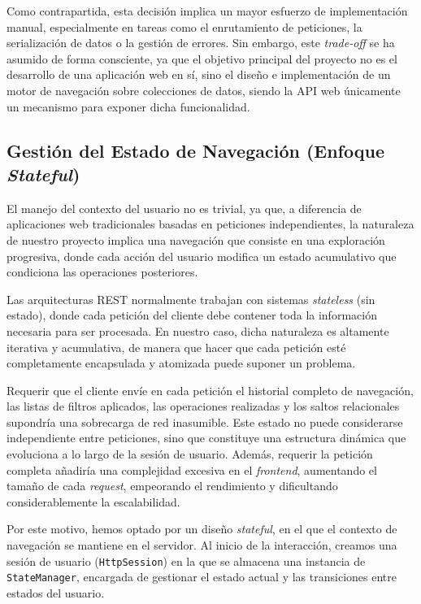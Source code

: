 Como contrapartida, esta decisión implica un mayor esfuerzo de implementación manual, especialmente en tareas
como el enrutamiento de peticiones, la serialización de datos o la gestión de errores. Sin embargo, este
\textit{trade-off} se ha asumido de forma consciente, ya que el objetivo principal del proyecto no es el
desarrollo de una aplicación web en sí, sino el diseño e implementación de un motor de navegación sobre
colecciones de datos, siendo la API web únicamente un mecanismo para exponer dicha funcionalidad.

    \subsection*{Gestión del Estado de Navegación (Enfoque \textit{Stateful})}

El manejo del contexto del usuario no es trivial, ya que, a diferencia de aplicaciones web tradicionales basadas 
en peticiones independientes, la naturaleza de nuestro proyecto implica una navegación que consiste en una exploración 
progresiva, donde cada acción del usuario modifica un estado acumulativo que condiciona las operaciones posteriores.

Las arquitecturas REST normalmente trabajan con sistemas \textit{stateless} (sin estado), donde cada petición del
cliente debe contener toda la información necesaria para ser procesada. En nuestro caso, dicha naturaleza es altamente
iterativa y acumulativa, de manera que hacer que cada petición esté completamente encapsulada y atomizada puede suponer
un problema.

Requerir que el cliente envíe en cada petición el historial completo de navegación, las listas de filtros aplicados,
las operaciones realizadas y los saltos relacionales supondría una sobrecarga de red inasumible. Este estado no puede
considerarse independiente entre peticiones, sino que constituye una estructura dinámica que evoluciona a lo largo de
la sesión de usuario. Además, requerir la petición completa añadiría una complejidad excesiva en el \textit{frontend},
aumentando el tamaño de cada \textit{request}, empeorando el rendimiento y dificultando considerablemente la escalabilidad.

Por este motivo, hemos optado por un diseño \textit{stateful}, en el que el contexto de navegación se mantiene en el
servidor. Al inicio de la interacción, creamos una sesión de usuario (\texttt{HttpSession}) en la que se almacena una
instancia de \texttt{StateManager}, encargada de gestionar el estado actual y las transiciones entre estados del usuario.

